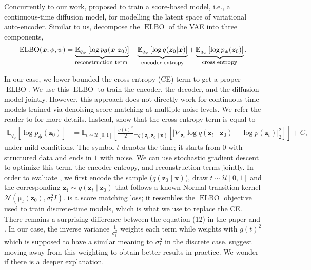 Concurrently to our work, \citet{vahdat2021score} proposed to train a score-based model, i.e., a continuous-time diffusion model, for modelling the latent space of variational auto-encoder. Similar to us, \citet{vahdat2021score} decompose the $\operatorname{ELBO}$ of the VAE into three components,
\begin{align}
  \operatorname{ELBO}(\mathbf{x}; \phi, \psi) =
  \underbrace{\mathbb{E}_{q_\psi}\left[ \log p_{\mathbf{\theta}}(\mathbf{x}|\mathbf{z}_0)\right]}_{\text{\footnotesize reconstruction term }} -
  \underbrace{\mathbb{E}_{q_\psi}\left[\log q(\mathbf{z}_0|\mathbf{x})\right]}_{\text{\footnotesize{encoder entropy}}} +
  \underbrace{\mathbb{E}_{q_\psi}\left[\log p_{\mathbf{\phi}}(\mathbf{z}_0)\right]}_{\text{\footnotesize{cross entropy}}}.
\end{align}

In our case, we lower-bounded the cross entropy (CE) term to get a proper $\operatorname{ELBO}$. We use this $\operatorname{ELBO}$ to train the encoder, the decoder, and the diffusion model jointly. However, this approach does not directly work for continuous-time models trained via denoising score matching at multiple noise levels. We refer the reader to  for more details. Instead, \citet{vahdat2021score} show that the cross entropy term is equal to
\begin{align}
  \mathbb{E}_{q_\psi}\left[\log p_{\mathbf{\phi}}(\mathbf{z}_0)\right] &= \mathbb{E}_{t \sim \mathcal{U}\left[0, 1\right]}\left[ \frac{g(t)^2}{2} \mathbb{E}_{q(\bm{z}_t, \bm{z_0} \mid \bm{x})}\left[ \lvert \nabla_{\bm{z}_t} \log q(\bm{z}_t \mid \bm{z}_0) - \log p(\bm{z}_t) \rvert_2^2 \right] \right] + C, \label{eq:CE_continuous_diffusion}
\end{align}
under mild conditions. The symbol $t$ denotes the time; it starts from $0$ with structured data and ends in $1$ with noise. We can use stochastic gradient descent to optimize this term, the encoder entropy, and reconstruction terms jointly. In order to evaluate , we first encode the sample ($q(\bm{z}_0 \mid \bm{x})$), draw $t\sim \mathcal{U}\left[0, 1\right]$ and the corresponding $\bm{z_t} \sim q(\bm{z}_t \mid \bm{z}_0)$ that follows a known Normal transition kernel $\mathcal{N}\left( \bm{\mu}_t(\bm{z}_0), \sigma_t^2 I \right)$. \label{eq:CE_continuous_diffusion} is a score matching loss; it resembles the $\operatorname{ELBO}$ objective used to train discrete-time models, which is what we use to replace the CE. There remains a surprising difference between the equation (12) in the paper and . In our case, the inverse variance $\frac{1}{\sigma_t^2}$ weights each term while  weights with $g(t)^2$ which is supposed to have a similar meaning to $\sigma_t^2$ in the discrete case. \citet{vahdat2021score} suggest moving away from this weighting to obtain better results in practice. We wonder if there is a deeper explanation.

